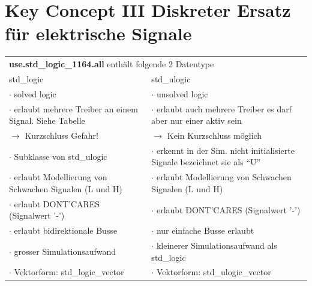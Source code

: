 \section{Key Concept III \tiny Diskreter Ersatz für elektrische Signale}

\begin{tabular}{l|l}
	\multicolumn{2}{l}{\textbf{use.std\_logic\_1164.all} enthält folgende 2 Datentype}  \\
	std\_logic														& std\_ulogic \\
	\hline
	$\cdot$ solved logic											& $\cdot$ unsolved logic\\
	$\cdot$ erlaubt mehrere Treiber an einem Signal. Siehe Tabelle	& $\cdot$ erlaubt auch mehrere Treiber es darf aber nur einer aktiv sein \\
	$\rightarrow$ Kurzschluss Gefahr!								& $\rightarrow$ Kein Kurzschluss möglich  \\
	$\cdot$ Subklasse von std\_ulogic								& $\cdot$ erkennt in der Sim. nicht initialisierte Signale {\tiny bezeichnet sie als "`U"'}\\
	$\cdot$ erlaubt Modellierung von Schwachen Signalen (L und H)	& $\cdot$ erlaubt Modellierung von Schwachen Signalen (L und H)\\
	$\cdot$ erlaubt DONT'CARES (Signalwert '-')						& $\cdot$ erlaubt DONT'CARES (Signalwert '-')	\\
	$\cdot$ erlaubt bidirektionale Busse							& $\cdot$ nur einfache Busse erlaubt\\
	$\cdot$ grosser Simulationsaufwand								& $\cdot$ kleinerer Simulationsaufwand als std\_logic\\
	$\cdot$ Vektorform: std\_logic\_vector							& $\cdot$ Vektorform: std\_ulogic\_vector\\
\end{tabular}

